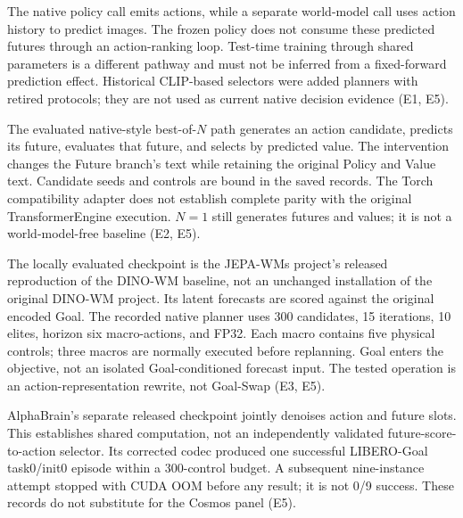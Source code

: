 \documentclass[11pt]{article}
\begin{document}
\begin{description}[style=nextline,leftmargin=0pt]
\item[WorldAgen: prediction is not native frozen-policy ranking.]
The native policy call emits actions, while a separate world-model call uses
action history to predict images. The frozen policy does not consume these
predicted futures through an action-ranking loop. Test-time training through
shared parameters is a different pathway and must not be inferred from a
fixed-forward prediction effect. Historical CLIP-based selectors were added
planners with retired protocols; they are not used as current native decision
evidence (E1, E5).

\item[Cosmos Policy: generated candidate, conditioned future, predicted value.]
The evaluated native-style best-of-$N$ path generates an action candidate,
predicts its future, evaluates that future, and selects by predicted value.
The intervention changes the Future branch's text while retaining the original
Policy and Value text. Candidate seeds and controls are bound in the saved
records. The Torch compatibility adapter does not establish complete parity
with the original TransformerEngine execution. $N=1$ still generates futures
and values; it is not a world-model-free baseline (E2, E5).

\item[DINO-WM: predicted latent distance drives native CEM.]
The locally evaluated checkpoint is the JEPA-WMs project's released reproduction
of the DINO-WM baseline, not an unchanged installation of the original DINO-WM
project. Its latent forecasts are scored against the original encoded Goal.
The recorded native planner uses 300 candidates, 15 iterations, 10 elites,
horizon six macro-actions, and FP32. Each macro contains five physical
controls; three macros are normally executed before replanning. Goal enters
the objective, not an isolated Goal-conditioned forecast input. The tested
operation is an action-representation rewrite, not Goal-Swap (E3, E5).
\end{description}

AlphaBrain's separate released checkpoint jointly denoises action and future
slots. This establishes shared computation, not an independently validated
future-score-to-action selector. Its corrected codec produced one successful
LIBERO-Goal task0/init0 episode within a 300-control budget. A subsequent
nine-instance attempt stopped with CUDA OOM before any result; it is not
0/9 success. These records do not substitute for the Cosmos panel (E5).
\end{document}
